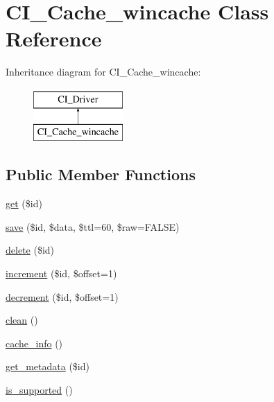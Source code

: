 \hypertarget{class_c_i___cache__wincache}{}\section{C\+I\+\_\+\+Cache\+\_\+wincache Class Reference}
\label{class_c_i___cache__wincache}
Inheritance diagram for C\+I\+\_\+\+Cache\+\_\+wincache\+:\begin{figure}[H]
\begin{center}
\leavevmode
\includegraphics[height=2.000000cm]{class_c_i___cache__wincache}
\end{center}
\end{figure}
\subsection*{Public Member Functions}
\begin{DoxyCompactItemize}
\item 
\hyperlink{class_c_i___cache__wincache_a50e3bfb586b2f42932a6a93f3fbb0828}{get} (\$id)
\item 
\hyperlink{class_c_i___cache__wincache_a472645db04a8ce4b040b789a3062a7d2}{save} (\$id, \$data, \$ttl=60, \$raw=F\+A\+L\+S\+E)
\item 
\hyperlink{class_c_i___cache__wincache_a2f8258add505482d7f00ea26493a5723}{delete} (\$id)
\item 
\hyperlink{class_c_i___cache__wincache_a2f07a4e09b57f4460d49852497d1808f}{increment} (\$id, \$offset=1)
\item 
\hyperlink{class_c_i___cache__wincache_a4eb1c2772c8efc48c411ea060dd040b7}{decrement} (\$id, \$offset=1)
\item 
\hyperlink{class_c_i___cache__wincache_adb40b812890a8bc058bf6b7a0e1a54d9}{clean} ()
\item 
\hyperlink{class_c_i___cache__wincache_acb4742926a6fa901e4f0917e1a35ef4c}{cache\+\_\+info} ()
\item 
\hyperlink{class_c_i___cache__wincache_a59635cf18e997c5141bffa05ff7622e0}{get\+\_\+metadata} (\$id)
\item 
\hyperlink{class_c_i___cache__wincache_a98c68fd153468bc148c4ed8c716859fc}{is\+\_\+supported} ()
\end{DoxyCompactItemize}
